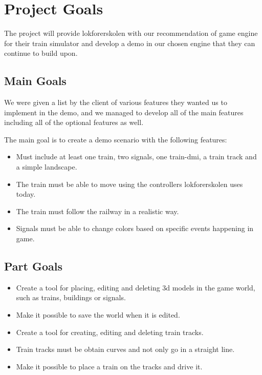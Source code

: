 
\section{Project Goals}
The project will provide \Gls{lokforerskolen} with our recommendation of game engine for their train simulator and develop a demo in our chosen engine that they can continue to build upon. 

\subsection{Main Goals}
We were given a list by the client of various features they wanted us to implement in the demo, and we managed to develop all of the main features including all of the optional features as well.

The main goal is to create a demo scenario with the following features:
\begin{itemize}
    \item Must include at least one train, two signals, one train-\acrshort{dmi}, a train track and a simple landscape.
    \item The train must be able to move using the controllers \Gls{lokforerskolen} uses today.
    \item The train must follow the railway in a realistic way.
    \item Signals must be able to change colors based on specific events happening in game.
\end{itemize}

\subsection{Part Goals}
\begin{itemize}
    \item Create a tool for placing, editing and deleting \acrshort{3d} models in the game world, such as trains, buildings or signals.
    \item Make it possible to save the world when it is edited.
    \item Create a tool for creating, editing and deleting train tracks.
    \item Train tracks must be obtain curves and not only go in a straight line.
    \item Make it possible to place a train on the tracks and drive it.
\end{itemize}

